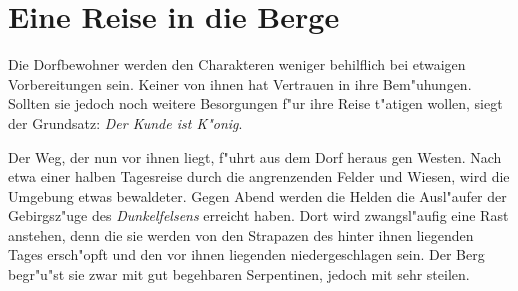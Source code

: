 \chapter{Eine Reise in die Berge}
\par Die Dorfbewohner werden den Charakteren weniger behilflich bei etwaigen Vorbereitungen sein. Keiner von ihnen hat Vertrauen in ihre Bem"uhungen. Sollten sie jedoch noch weitere Besorgungen f"ur ihre Reise t"atigen wollen, siegt der Grundsatz: \textit{Der Kunde ist K"onig}.
\par Der Weg, der nun vor ihnen liegt, f"uhrt aus dem Dorf heraus gen Westen. Nach etwa einer halben Tagesreise durch die angrenzenden Felder und Wiesen, wird die Umgebung etwas bewaldeter. Gegen Abend werden die Helden die Ausl"aufer der Gebirgsz"uge des \textit{Dunkelfelsens} erreicht haben. Dort wird zwangsl"aufig eine Rast anstehen, denn die sie werden von den Strapazen des hinter ihnen liegenden Tages ersch"opft und den vor ihnen liegenden niedergeschlagen sein. Der Berg begr"u"st sie zwar mit gut begehbaren Serpentinen, jedoch mit sehr steilen.
